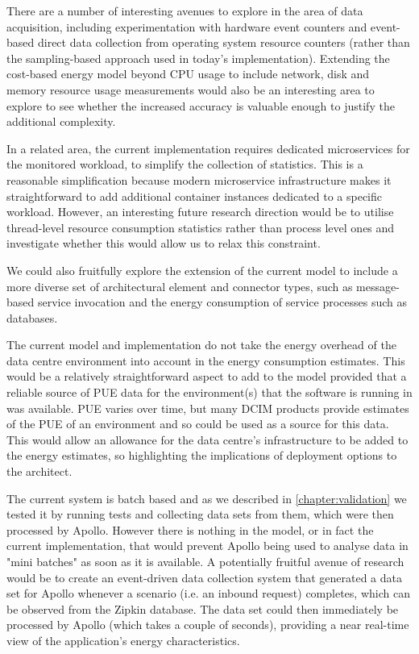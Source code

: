 There are a number of interesting avenues to explore in the area of data acquisition, including experimentation with hardware event counters and event-based direct data collection from operating system resource counters (rather than the sampling-based approach used in today's implementation).  Extending the cost-based energy model beyond CPU usage to include network, disk and memory resource usage measurements would also be an interesting area to explore to see whether the increased accuracy is valuable enough to justify the additional complexity.

In a related area, the current implementation requires dedicated microservices for the monitored workload, to simplify the collection of statistics.  This is a reasonable simplification because modern microservice infrastructure makes it straightforward to add additional container instances dedicated to a specific workload.  However, an interesting future research direction would be to utilise thread-level resource consumption statistics rather than process level ones and investigate whether this would allow us to relax this constraint.

We could also fruitfully explore the extension of the current model to include a more diverse set of architectural element and connector types, such as message-based service invocation and the energy consumption of service processes such as databases.

The current model and implementation do not take the energy overhead of the data centre environment into account in the energy consumption estimates.  This would be a relatively straightforward aspect to add to the model provided that a reliable source of PUE data for the environment(s) that the software is running in was available.  PUE varies over time, but many DCIM products provide estimates of the PUE of an environment and so could be used as a source for this data.  This would allow an allowance for the data centre's infrastructure to be added to the energy estimates, so highlighting the implications of deployment options to the architect.

The current system is batch based and as we described in \cref{chapter:validation} we tested it by running tests and collecting data sets from them, which were then processed by Apollo.  However there is nothing in the model, or in fact the current implementation, that would prevent Apollo being used to analyse data in "mini batches" as soon as it is available.  A potentially fruitful avenue of research would be to create an event-driven data collection system that generated a data set for Apollo whenever a scenario (i.e. an inbound request) completes, which can be observed from the Zipkin database.  The data set could then immediately be processed by Apollo (which takes a couple of seconds), providing a near real-time view of the application's energy characteristics.

